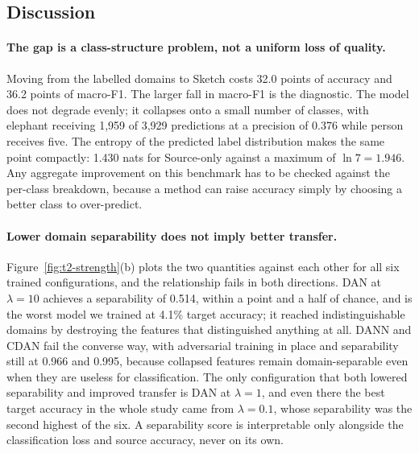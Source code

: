 \subsection{Discussion}
\label{sec:t2-discussion}

\paragraph{The gap is a class-structure problem, not a uniform loss of quality.}
Moving from the labelled domains to Sketch costs 32.0 points of accuracy and 36.2
points of macro-F1. The larger fall in macro-F1 is the diagnostic. The model does
not degrade evenly; it collapses onto a small number of classes, with elephant
receiving 1{,}959 of 3{,}929 predictions at a precision of 0.376 while person
receives five. The entropy of the predicted label distribution makes the same
point compactly: 1.430 nats for Source-only against a maximum of
$\ln 7 = 1.946$. Any aggregate improvement on this benchmark has to be checked
against the per-class breakdown, because a method can raise accuracy simply by
choosing a better class to over-predict.

\paragraph{Lower domain separability does not imply better transfer.}
Figure~\ref{fig:t2-strength}(b) plots the two quantities against each other for
all six trained configurations, and the relationship fails in both directions.
DAN at $\lambda = 10$ achieves a separability of 0.514, within a point and a half
of chance, and is the worst model we trained at 4.1\% target accuracy; it reached indistinguishable
domains by destroying the features that distinguished anything at all. DANN and
CDAN fail the converse way, with adversarial training in place and separability
still at 0.966 and 0.995, because collapsed features remain domain-separable even
when they are useless for classification. The only configuration that both lowered
separability and improved transfer is DAN at $\lambda = 1$, and even there the best
target accuracy in the whole study came from $\lambda = 0.1$, whose separability
was the second highest of the six. A separability score is interpretable only
alongside the classification loss and source accuracy, never on its own.

